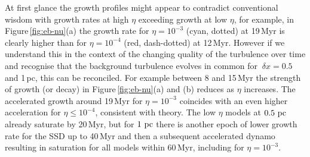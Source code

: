 \documentclass[preprint2]{aastex63}
\newcommand\pc{~ {\rm pc}}
\newcommand\dx{~ {\delta x}}
\begin{document}
At first glance the growth profiles might appear to contradict conventional
wisdom with growth rates at high $\eta$ exceeding growth at low $\eta$, for
example, in Figure\,\ref{fig:eb-nu}(a) the growth rate for $\eta=10^{-3}$ (cyan,
dotted) at 19\,Myr is clearly higher than for $\eta=10^{-4}$ (red, dash-dotted)
at 12\,Myr.
However if we understand this in the context of the changing quality of the 
turbulence over time and recognise that the background turbulence evolves in
common for $\dx=0.5$ and 1\,pc, this can be reconciled.
For example between 8 and 15\,Myr the strength of growth (or decay) in
Figure\,\ref{fig:eb-nu}(a) and (b) reduces as $\eta$ increases.
The accelerated growth around 19\,Myr for $\eta=10^{-3}$ coincides with an
even higher acceleration for $\eta\le10^{-4}$, consistent with theory.
The low $\eta$ models at $0.5\pc$ already saturate by 20\,Myr, but for $1\pc$ there
is another epoch of lower growth rate for the SSD up to
40\,Myr and then a subsequent accelerated dynamo resulting in saturation for
all models within 60\,Myr, including for $\eta=10^{-3}$.
\end{document}
